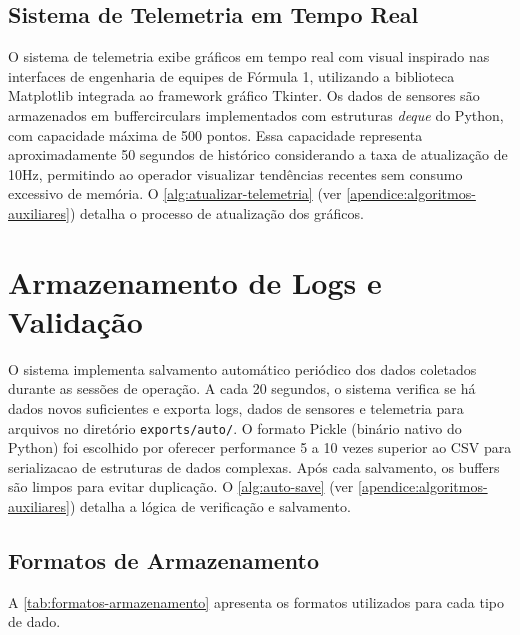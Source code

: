 \subsection{Sistema de Telemetria em Tempo Real}
\label{subsec:telemetria-cliente}

O sistema de telemetria exibe gráficos em tempo real com visual inspirado nas interfaces de engenharia de equipes de Fórmula 1, utilizando a biblioteca Matplotlib integrada ao framework gráfico Tkinter. Os dados de sensores são armazenados em \glspl{buffercircular} implementados com estruturas \textit{deque} do Python, com capacidade máxima de 500 pontos. Essa capacidade representa aproximadamente 50 segundos de histórico considerando a taxa de atualização de 10Hz, permitindo ao operador visualizar tendências recentes sem consumo excessivo de memória. O \autoref{alg:atualizar-telemetria} (ver \autoref{apendice:algoritmos-auxiliares}) detalha o processo de atualização dos gráficos.

\section{Armazenamento de Logs e Validação}
\label{sec:logs-validacao}

O sistema implementa salvamento automático periódico dos dados coletados durante as sessões de operação. A cada 20 segundos, o sistema verifica se há dados novos suficientes e exporta logs, dados de sensores e telemetria para arquivos no diretório \texttt{exports/auto/}. O formato Pickle (binário nativo do Python) foi escolhido por oferecer performance 5 a 10 vezes superior ao CSV para \gls{serializacao} de estruturas de dados complexas. Após cada salvamento, os buffers são limpos para evitar duplicação. O \autoref{alg:auto-save} (ver \autoref{apendice:algoritmos-auxiliares}) detalha a lógica de verificação e salvamento.

\subsection{Formatos de Armazenamento}
\label{subsec:formatos-armazenamento}

A \autoref{tab:formatos-armazenamento} apresenta os formatos utilizados para cada tipo de dado.

\begin{table}[!h]
\captionsetup{width=16cm}
\end{table}

